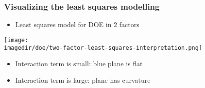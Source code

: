 \begin{frame}\frametitle{Visualizing the least squares modelling}
	\begin{itemize}
		\item	Least squares model for DOE in 2 factors
	\end{itemize}
	\begin{center}
		\texttt{[image: \\imagedir/doe/two-factor-least-squares-interpretation.png]}
	\end{center}
	\begin{itemize}
		\item	Interaction term is small: blue plane is flat
		\item	Interaction term is large: plane has curvature
	\end{itemize}
\end{frame}

